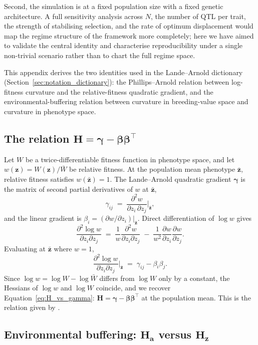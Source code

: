 \documentclass[9pt,twocolumn,twoside,lineno]{gsajnl}
\newcommand{\vect}[1]{\boldsymbol{#1}}
\newcommand{\mat}[1]{\mathbf{#1}}
\begin{document}
Second, the simulation is at a fixed population size with a fixed genetic architecture. A full sensitivity analysis across $N$, the number of QTL per trait, the strength of stabilising selection, and the rate of optimum displacement would map the regime structure of the framework more completely; here we have aimed to validate the central identity and characterise reproducibility under a single non-trivial scenario rather than to chart the full regime space.

This appendix derives the two identities used in the Lande--Arnold dictionary (Section~\ref{sec:notation_dictionary}): the Phillips--Arnold relation between log-fitness curvature and the relative-fitness quadratic gradient, and the environmental-buffering relation between curvature in breeding-value space and curvature in phenotype space.

\subsection{The relation $\mat{H} = \bm{\gamma}-\bm{\beta}\bm{\beta}^{\top}$}

Let $W$ be a twice-differentiable fitness function in phenotype space, and let $w(\vect{z}) = W(\vect{z})/\bar{W}$ be relative fitness. At the population mean phenotype $\bar{\vect{z}}$, relative fitness satisfies $w(\bar{\vect{z}})=1$. The Lande--Arnold quadratic gradient $\bm{\gamma}$ is the matrix of second partial derivatives of $w$ at $\bar{\vect{z}}$,
\[
\gamma_{ij} \;=\; \frac{\partial^2 w}{\partial z_i\,\partial z_j}\bigg|_{\bar{\vect{z}}},
\]
and the linear gradient is $\beta_i = (\partial w/\partial z_i)|_{\bar{\vect{z}}}$. Direct differentiation of $\log w$ gives
\[
\frac{\partial^2 \log w}{\partial z_i \partial z_j}
\;=\;
\frac{1}{w}\frac{\partial^2 w}{\partial z_i \partial z_j}
\;-\;
\frac{1}{w^2}\frac{\partial w}{\partial z_i}\frac{\partial w}{\partial z_j}.
\]
Evaluating at $\bar{\vect{z}}$ where $w=1$,
\[
\frac{\partial^2 \log w}{\partial z_i \partial z_j}\bigg|_{\bar{\vect{z}}}
\;=\;
\gamma_{ij} - \beta_i\beta_j.
\]
Since $\log w = \log W - \log\bar{W}$ differs from $\log W$ only by a constant, the Hessians of $\log w$ and $\log W$ coincide, and we recover Equation~\eqref{eq:H_vs_gamma}: $\mat{H} = \bm{\gamma}-\bm{\beta}\bm{\beta}^{\top}$ at the population mean. This is the relation given by \citet{PhillipsArnold1989}.

\subsection{Environmental buffering: $\mat{H}_{\vect{a}}$ versus $\mat{H}_{\vect{z}}$}
\end{document}
